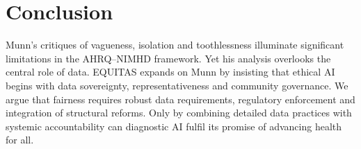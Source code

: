 \documentclass[11pt,twoside]{article}
\begin{document}
\section{Conclusion}
Munn’s critiques of vagueness, isolation and toothlessness illuminate significant limitations in the AHRQ–NIMHD framework. Yet his analysis overlooks the central role of data. EQUITAS expands on Munn by insisting that ethical AI begins with data sovereignty, representativeness and community governance. We argue that fairness requires robust data requirements, regulatory enforcement and integration of structural reforms. Only by combining detailed data practices with systemic accountability can diagnostic AI fulfil its promise of advancing health for all.
\end{document}
